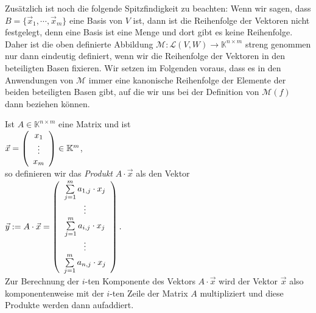 Zus\"{a}tzlich ist noch die folgende Spitzfindigkeit zu beachten:  Wenn wir sagen, dass 
$B = \{\vec{x}_1, \cdots, \vec{x}_m \}$ eine Basis von $V$ ist, dann ist die Reihenfolge der
Vektoren nicht festgelegt, denn eine Basis ist eine Menge und dort gibt es keine
Reihenfolge.  Daher ist die oben definierte Abbildung $\mathcal{M}: \mathcal{L}(V,W) \rightarrow\mathbb{K}^{n \times m}$ 
streng genommen nur dann eindeutig definiert, wenn wir die Reihenfolge der Vektoren in den
beteiligten Basen fixieren. 
Wir setzen im Folgenden voraus, dass es in den Anwendungen von $\mathcal{M}$ immer eine kanonische
Reihenfolge der Elemente der beiden beteiligten Basen gibt, auf die wir uns bei der Definition von
$\mathcal{M}(f)$ dann beziehen k\"{o}nnen.
\eox


 Ist $A \in \mathbb{K}^{n \times m}$ eine Matrix und ist 
\\[0.5cm]
\hspace*{1.3cm}
$\vec{x} = \left(
      \begin{array}[c]{c}
      x_{1}  \\
      \vdots \\
      x_{m}  \\
      \end{array}
    \right) \in \mathbb{K}^m
$,
\\[0.5cm]
so definieren wir das {\emph{\color{blue}Produkt}} $A \cdot \vec{x}$ als den Vektor
\\[0.5cm]
\hspace*{1.3cm}
$\vec{y} := A \cdot \vec{x} = \left(
      \begin{array}[c]{c}
      \sum\limits_{j=1}^m a_{1,j} \cdot x_{j}  \\
      \vdots \\
      \sum\limits_{j=1}^m a_{i,j} \cdot x_{j}  \\
      \vdots \\
      \sum\limits_{j=1}^m a_{n,j} \cdot x_{j}  \\
      \end{array}
      \right). 
$
\\[0.5cm]
Zur Berechnung der $i$-ten Komponente des Vektors $A \cdot \vec{x}$ wird der Vektor $\vec{x}$
also komponentenweise mit der $i$-ten Zeile der Matrix $A$ multipliziert und diese Produkte werden
dann aufaddiert.

